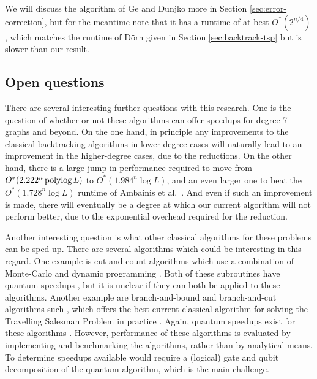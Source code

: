 We will discuss the algorithm of Ge and Dunjko more in Section \ref{sec:error-correction}, but for the meantime note that it has a runtime of at best $O^*(2^{n/4})$, which matches the runtime of D\"{o}rn \cite{dorn2007} given in Section \ref{sec:backtrack-tsp} but is slower than our result.

\subsection{Open questions}

There are several interesting further questions with this research. One is the question of whether or not these algorithms can offer speedups for degree-7 graphs and beyond. On the one hand, in principle any improvements to the classical backtracking algorithms in lower-degree cases will naturally lead to an improvement in the higher-degree cases, due to the reductions. On the other hand, there is a large jump in performance required to move from $O^*(2.222^n\operatorname{polylog} L)$ to $O^*(1.984^n\log L)$, and an even larger one to beat the $O^*(1.728^n\log L)$ runtime of Ambainis et al.~\cite{ambainis2018}. And even if such an improvement is made, there will eventually be a degree at which our current algorithm will not perform better, due to the exponential overhead required for the reduction.

Another interesting question is what other classical algorithms for these problems can be sped up. There are several algorithms which could be interesting in this regard. One example is cut-and-count algorithms which use a combination of Monte-Carlo and dynamic programming \cite{bjorklund14,bodlaender15,cygan11}. Both of these subroutines have quantum speedups \cite{montanaro2015mc, ronagh2019}, but it is unclear if they can both be applied to these algorithms. Another example are branch-and-bound and branch-and-cut algorithms such \cite{little1963, padberg1991}, which offers the best current classical algorithm for solving the Travelling Salesman Problem in practice \cite{applegate2006}. Again, quantum speedups exist for these algorithms \cite{montanaro2019}. However, performance of these algorithms is evaluated by implementing and benchmarking the algorithms, rather than by analytical means. To determine speedups available would require a (logical) gate and qubit decomposition of the quantum algorithm, which is the main challenge.
